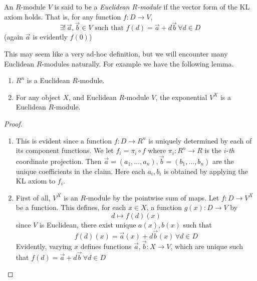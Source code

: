 \begin{defn}
  An \( R \)-module \( V \) is said to be a \emph{Euclidean \( R \)-module} if the vector form of the KL axiom holds. That is, for any function \( f: D\to V \),
  \begin{equation*}
    \exists! \, \vec a,\vec b\in V \text{ such that } f(d) = \vec a + d\vec b \,\forall d\in D
  \end{equation*}
  (again \( \vec a \) is evidently \( f(0) \))
\end{defn}

This may seem like a very ad-hoc definition, but we will encounter many Euclidean \( R \)-modules naturally. For example we have the following lemma.

\begin{lemma}
  \leavevmode
  \begin{enumerate}
    \item \( R^n \) is a Euclidean \( R \)-module.
    \item For any object \( X \), and Euclidean \( R \)-module \( V \), the exponential \( V^X \) is a Euclidean \( R \)-module. 
  \end{enumerate}
  \label{lm:Emod}
\end{lemma}

\begin{proof}
  \leavevmode
  \begin{enumerate}
    \item This is evident since a function \( f:D\to R^n \) is uniquely determined by each of its component functions. We let \( f_i = \pi_i \circ{f}  \) where \( \pi_i:R^n\to R \) is the \( i \)-\textit{th} coordinate projection. Then \( \vec a=(a_1,\dots,a_n), \vec b=(b_1,\dots,b_n) \) are the unique coefficients in the claim. Here each \( a_i,b_i \) is obtained by applying the KL axiom to \( f_i \).
    \item First of all, \( V^X \) is an \( R \)-module by the pointwise sum of maps. Let \( f:D\to V^X \) be a function. This defines, for each \( x\in X \), a function \( g(x):D\to V \) by
    \begin{equation*}
      d\mapsto f(d)(x)
    \end{equation*}
    since \( V \) is Euclidean, there exist unique \( a(x), b(x) \) such that
    \begin{equation*}
      f(d)(x) = \vec a(x) + d\vec b(x)\,\forall d\in D
    \end{equation*}
    Evidently, varying \( x \) defines functions \( \vec a,\vec b:X\to V \), which are unique such that \( f(d) = \vec a + d\vec b \,\forall d\in D\)
  \end{enumerate}
\end{proof}

